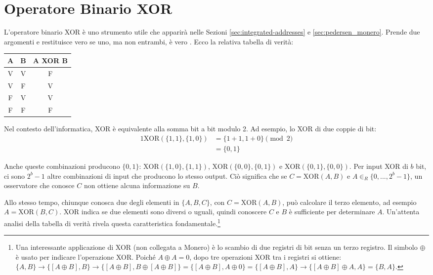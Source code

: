 \section{Operatore Binario XOR}
\label{sec:XOR_section}

L’operatore binario XOR è uno strumento utile che apparirà nelle Sezioni \ref{sec:integrated-addresses} e \ref{sec:pedersen_monero}. Prende due argomenti e restituisce vero se uno, ma non entrambi, è vero \cite{wolfram-xor}. Ecco la relativa tabella di verità:

\begin{center}
    \begin{tabular}{|c|c|c|}
    \hline
        A & B & A XOR B \\
    \hline\hline
        V & V & F \\
    \hline
        V & F & V \\
    \hline
        F & V & V \\
    \hline
        F & F & F \\
    \hline
    \end{tabular}
\end{center}

Nel contesto dell’informatica, XOR è equivalente alla somma bit a bit modulo 2. Ad esempio, lo XOR di due coppie di bit:
\begin{alignat*}{1}
    \text{XOR}(\{1,1\},\{1,0\}) &= \{1+1,1+0\} \pmod 2 \\
                                &= \{0,1\} 
\end{alignat*}

Anche queste combinazioni producono \(\{0,1\}\): \(\text{XOR}(\{1,0\},\{1,1\})\), \(\text{XOR}(\{0,0\},\{0,1\})\) e \(\text{XOR}(\{0,1\},\{0,0\})\). Per input XOR di \(b\) bit, ci sono \(2^{b} - 1\) altre combinazioni di input che producono lo stesso output. Ciò significa che se \(C = \text{XOR}(A,B)\) e \(A \in_R \{0,...,2^{b}-1\}\), un osservatore che conosce \(C\) non ottiene alcuna informazione su \(B\).

Allo stesso tempo, chiunque conosca due degli elementi in \(\{A,B,C\}\), con \(C = \text{XOR}(A,B)\), può calcolare il terzo elemento, ad esempio \(A = \text{XOR}(B,C)\). XOR indica se due elementi sono diversi o uguali, quindi conoscere \(C\) e \(B\) è sufficiente per determinare \(A\). Un’attenta analisi della tabella di verità rivela questa caratteristica fondamentale.\footnote{Una interessante applicazione di XOR (non collegata a Monero) è lo scambio di due registri di bit senza un terzo registro. Il simbolo \(\oplus\) è usato per indicare l’operazione XOR. Poiché \(A \oplus A = 0\), dopo tre operazioni XOR tra i registri si ottiene: \(\{A, B\} \rightarrow \{[A \oplus B], B\} \rightarrow \{[A \oplus B], B \oplus [A \oplus B]\} = \{[A \oplus B], A \oplus 0\} = \{[A \oplus B], A\} \rightarrow \{[A \oplus B] \oplus A, A\} = \{B, A\}\).}